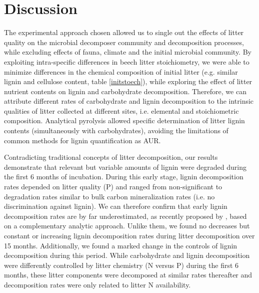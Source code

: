 \section*{Discussion}

The experimental approach chosen allowed us to single out the effects of litter quality on the microbial decomposer community and decomposition processes, while excluding effects of fauna, climate and the initial microbial community. By exploiting intra-specific differences in beech litter stoichiometry, we were able to minimize differences in the chemical composition of initial litter (e.g. similar lignin and cellulose content, table \ref{initstoech}), while exploring the effect of litter nutrient contents on lignin and carbohydrate decomposition. Therefore, we can attribute different rates of carbohydrate and lignin decomposition to the intrinsic qualities of litter collected at different sites, i.e. elemental and stoichiometric composition. Analytical pyrolysis allowed specific determination of litter lignin contents (simultaneously with carbohydrates), avoiding the limitations of common methods for lignin quantification as AUR.

Contradicting traditional concepts of litter decomposition, our results demonstrate that relevant but variable amounts of lignin were degraded during the first 6 months of incubation. During this early stage, lignin decomposition rates depended on litter quality (P) and ranged from non-significant to degradation rates similar to bulk carbon mineralization rates (i.e. no discrimination against lignin). We can therefore confirm that early lignin decomposition rates are by far underestimated, as recently proposed by \cite{Klotzbucher2011}, based on a complementary analytic approach. Unlike them, we found no decreases but constant or increasing lignin decomposition rates during litter decomposition over 15 months. Additionally, we found a marked change in the controls of lignin decomposition during this period. While carbohydrate and lignin decomposition were differently controlled by litter chemistry (N versus P) during the first 6 months, these litter components were decomposed at similar rates thereafter and decomposition rates were only related to litter N availability.

